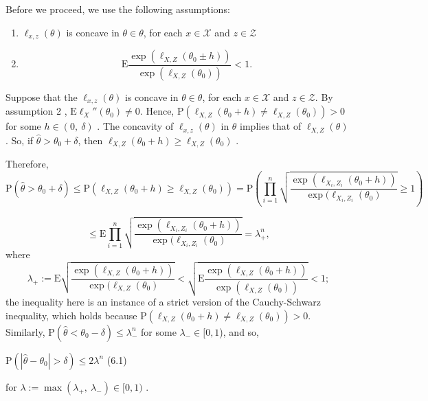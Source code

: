 Before we proceed, we use the following assumptions:

\begin{enumerate}
	\item $\ell_{x,z}(\theta)$ is concave in $\theta\in\theta$, for each $x\in \mathcal{X}$ and $z\in \mathcal{Z}$
	\item $$
	\mathrm{E}\frac{\exp(\ell_{X,Z}(\theta_{0}\pm h))}{\exp(\ell_{X,Z}(\theta_{0}))} < 1.$$
\end{enumerate}

Suppose that the $\ell_{x,z}(\theta)$ is concave in $\theta\in\theta$, for each $x\in \mathcal{X}$ and $z\in \mathcal{Z}$. By assumption 2 , $\mathrm{E}\ell_{X}''(\theta_{0})\neq 0$. Hence, $\mathrm{P}(\ell_{X,Z}(\theta_{0}+h)\neq\ell_{X,Z}(\theta_{0}))>0$ for some $h\in(0,\ \delta)$ . The concavity of $\ell_{x,z}(\theta)$ in $\theta$ implies that of $\ell_{X,Z}(\theta)$ . So, if $\hat{\theta}>\theta_{0}+\delta$, then $\ell_{X,Z}(\theta_{0}+h)\geq\ell_{X,Z}(\theta_{0})$ .

Therefore,
$$
\mathrm{P}(\hat{\theta}>\theta_{0}+\delta)\leq \mathrm{P}(\ell_{X,Z}(\theta_{0}+h)\geq\ell_{X,Z}(\theta_{0}))=\mathrm{P}(\prod_{i=1}^{n}\sqrt{\frac{\exp(\ell_{X_i,Z_i}(\theta_{0}+h))}{\exp(\ell_{X_i,Z_i}(\theta_{0})}}\geq 1)
$$

$$
\leq \mathrm{E}\prod_{i=1}^{n}\sqrt{\frac{\exp(\ell_{X_i,Z_i}(\theta_{0}+h))}{\exp(\ell_{X_i,Z_i}(\theta_{0})}}=\lambda_{+}^{n},
$$
where
$$
\lambda_{+}:=\mathrm{E}\sqrt{\frac{\exp(\ell_{X,Z}(\theta_{0}+h))}{\exp(\ell_{X,Z}(\theta_{0})}}<\sqrt{\mathrm{E}\frac{\exp(\ell_{X,Z}(\theta_{0}+h))}{\exp(\ell_{X,Z}(\theta_{0}))}} < 1;$$
the inequality here is an instance of a strict version of the Cauchy-Schwarz inequality, which holds because $\mathrm{P}(\ell_{X,Z}(\theta_{0}+h)\neq\ell_{X,Z}(\theta_{0}))>0$. Similarly, $\mathrm{P}(\hat{\theta}<\theta_{0}-\delta)\leq\lambda_{-}^{n}$ for some $\lambda_{-}\in[0,1$), and so,
\begin{center}
	$\mathrm{P}(|\hat{\theta}-\theta_{0}|>\delta)\leq 2\lambda^{n}$   (6.1)
\end{center}
for $\lambda :=\displaystyle \max(\lambda_{+},\ \lambda_{-})\in[0,1)$ .